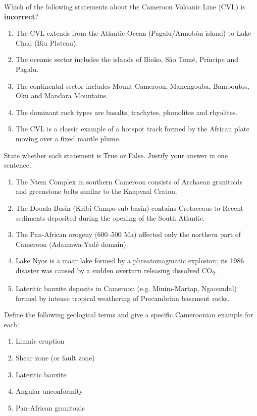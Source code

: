 \documentclass[11pt]{article}
\begin{document}
\begin{exercice}
Which of the following statements about the Cameroon Volcanic Line (CVL) is \textbf{incorrect}?
\begin{enumerate}
\item The CVL extends from the Atlantic Ocean (Pagalu/Annobón island) to Lake Chad (Biu Plateau).
\item The oceanic sector includes the islands of Bioko, São Tomé, Príncipe and Pagalu.
\item The continental sector includes Mount Cameroon, Manengouba, Bamboutos, Oku and Mandara Mountains.
\item The dominant rock types are basalts, trachytes, phonolites and rhyolites.
\item The CVL is a classic example of a hotspot track formed by the African plate moving over a fixed mantle plume.
\end{enumerate}
\end{exercice}

\begin{exercice}
State whether each statement is True or False. Justify your answer in one sentence.
\begin{enumerate}
\item The Ntem Complex in southern Cameroon consists of Archaean granitoids and greenstone belts similar to the Kaapvaal Craton.
\item The Douala Basin (Kribi-Campo sub-basin) contains Cretaceous to Recent sediments deposited during the opening of the South Atlantic.
\item The Pan-African orogeny (600–500 Ma) affected only the northern part of Cameroon (Adamawa-Yadé domain).
\item Lake Nyos is a maar lake formed by a phreatomagmatic explosion; its 1986 disaster was caused by a sudden overturn releasing dissolved CO\textsubscript{2}.
\item Lateritic bauxite deposits in Cameroon (e.g. Minim-Martap, Ngaoundal) formed by intense tropical weathering of Precambrian basement rocks.
\end{enumerate}
\end{exercice}

\begin{exercice}[Definitions]
Define the following geological terms and give a specific Cameroonian example for each:
\begin{enumerate}
\item Limnic eruption
\item Shear zone (or fault zone)
\item Lateritic bauxite
\item Angular unconformity
\item Pan-African granitoids
\end{enumerate}
\end{exercice}
\end{document}
